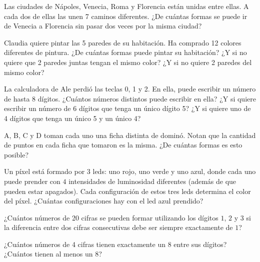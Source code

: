 \begin{problem}[$4 \clubsuit$]
    Las ciudades de Nápoles, Venecia, Roma y Florencia están 
    unidas entre ellas. A cada dos de ellas las unen 7 caminos 
    diferentes. ¿De cuántas formas se puede ir de Venecia a
    Florencia sin pasar dos veces por la misma ciudad?
\end{problem}

\begin{problem}[$6 \clubsuit$]
    Claudia quiere pintar las 5 paredes de su habitación. 
    Ha comprado 12 colores diferentes de pintura. ¿De cuántas 
    formas puede pintar su habitación? ¿Y si no quiere que 2 
    paredes juntas tengan el mismo color? ¿Y si no quiere 2 
    paredes del mismo color?
\end{problem}

\begin{problem}[$6 \clubsuit$]
    La calculadora de Ale perdió las teclas 0, 1 y 2. En ella, 
    puede escribir un número de hasta 8 dígitos. ¿Cuántos 
    números distintos puede escribir en ella? ¿Y si quiere 
    escribir un número de 6 dígitos que tenga un único dígito 
    5? ¿Y si quiere uno de 4 dígitos que tenga un único 5 y un 
    único 4?
\end{problem}

\begin{problem}[$4 \clubsuit$]
    A, B, C y D toman cada uno una ficha distinta de dominó. 
    Notan que la cantidad de puntos en cada ficha que tomaron 
    es la misma. ¿De cuántas formas es esto posible?
\end{problem}

\begin{problem}
    Un píxel está formado por $3$ leds: uno rojo, uno verde y uno azul, 
    donde cada uno puede prender con $4$ intensidades de luminosidad 
    diferentes (además de que pueden estar apagados). Cada configuración 
    de estos tres leds determina el color del píxel. ¿Cuántas 
    configuraciones hay con el led azul prendido?
\end{problem}

\begin{problem}[$4 \clubsuit$]
    ¿Cuántos números de 20 cifras se pueden formar utilizando los dígitos 
    $1$, $2$ y $3$ si la diferencia entre dos cifras consecutivas debe ser 
    siempre exactamente de $1$?
\end{problem}

\begin{problem}[$4 \clubsuit$]
    ¿Cuántos números de 4 cifras tienen exactamente un 8 entre sus dígitos?
    ¿Cuántos tienen al menos un 8?
\end{problem}

